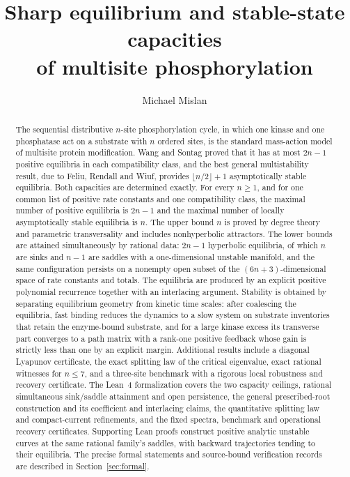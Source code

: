 \documentclass[11pt]{article}
\title{Sharp equilibrium and stable-state capacities\\ of multisite phosphorylation}
\author{Michael Mislan}
\date{}
\theoremstyle{plain}
\theoremstyle{definition}
\theoremstyle{remark}
\numberwithin{equation}{section}
\begin{document}
\maketitle

\begin{abstract}
The sequential distributive \(n\)-site phosphorylation cycle, in which one kinase and one
phosphatase act on a substrate with \(n\) ordered sites, is the standard mass-action model of
multisite protein modification. Wang and Sontag proved that it has at most \(2n-1\) positive
equilibria in each compatibility class, and the best general multistability result, due to
Feliu, Rendall and Wiuf, provides \(\lfloor n/2\rfloor+1\) asymptotically stable equilibria. Both
capacities are determined exactly. For every \(n\ge1\), and for one common list of positive rate
constants and one compatibility class, the maximal number of positive equilibria is \(2n-1\)
and the maximal number of locally asymptotically stable equilibria is \(n\). The upper bound
\(n\) is proved by degree theory and parametric transversality and includes nonhyperbolic
attractors. The lower bounds are attained simultaneously by rational data: \(2n-1\) hyperbolic
equilibria, of which \(n\) are sinks and \(n-1\) are saddles with a one-dimensional unstable
manifold, and the same configuration persists on a nonempty open subset of the
\((6n+3)\)-dimensional space of rate constants and totals. The equilibria are produced by an
explicit positive polynomial recurrence together with an interlacing argument. Stability is
obtained by separating equilibrium geometry from kinetic time scales: after coalescing the
equilibria, fast binding reduces the dynamics to a slow system on substrate inventories that
retain the enzyme-bound substrate, and for a large kinase excess its transverse part converges
to a path matrix with a rank-one positive feedback whose gain is strictly less than one by an
explicit margin. Additional results include a diagonal Lyapunov certificate, the exact splitting law of the
critical eigenvalue, exact rational witnesses for \(n\le7\), and a three-site benchmark with a
rigorous local robustness and recovery certificate. The Lean~4 formalization covers the two
capacity ceilings, rational simultaneous sink/saddle attainment and open persistence, the
general prescribed-root construction and its coefficient and interlacing claims, the
quantitative splitting law and compact-current refinements, and the fixed spectra, benchmark
and operational recovery certificates. Supporting Lean proofs construct positive analytic
unstable curves at the same rational family's saddles, with backward trajectories tending
to their equilibria. The precise formal
statements and source-bound verification records are described in Section~\ref{sec:formal}.
\end{abstract}
\end{document}
